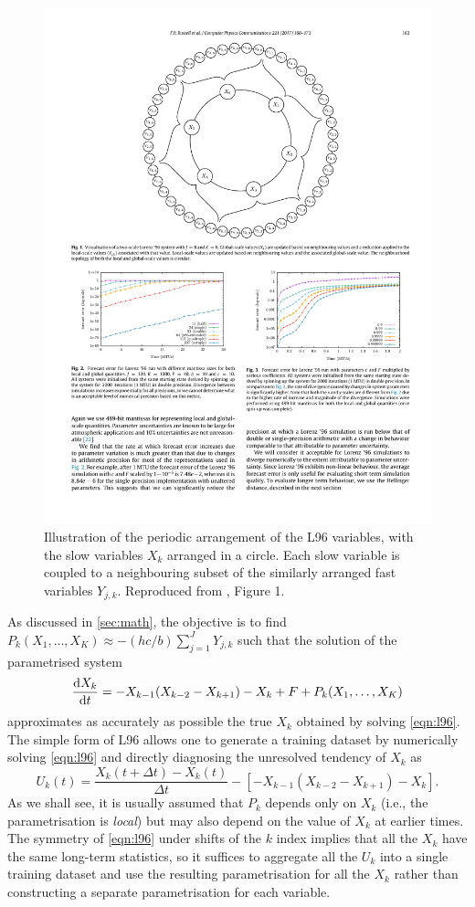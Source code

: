 \documentclass[../main.tex]{subfiles}
\begin{document}
\begin{figure}[ht]
    \centering
    \includegraphics[width=0.7\linewidth]{figures/russell2017_L96_diagram.pdf}
    \caption{ Illustration of the periodic arrangement of the L96 variables,
        with the slow variables $X_k$ arranged in a circle. Each slow variable
        is coupled to a neighbouring subset of the similarly arranged fast
        variables $Y_{j,k}$. Reproduced from \textcite{russell2017}, Figure 1.
        }
    \label{fig:L96_diagram}
\end{figure}

As discussed in \cref{sec:math}, the objective is to find $P_k(X_1,
\dots, X_K) \approx -(hc/b) \sum_{j=1}^J Y_{j,k}$ such that the solution of the
parametrised system
\begin{equation*}
    \frac{\mathrm{d} X_k}{\mathrm{d} t}
        = -X_{k-1} (X_{k-2} - X_{k+1}) - X_k + F + P_k(X_1, \dots, X_K)
\end{equation*}
approximates as accurately as possible the true $X_k$ obtained by solving
\cref{eqn:l96}. The simple form of L96 allows one to generate a training
dataset by numerically solving \cref{eqn:l96} and directly diagnosing the
unresolved tendency of $X_k$ as
\begin{equation} \label{eqn:l96_tendency}
    U_k(t) = \frac{X_k(t + \Delta t) - X_k(t)}{\Delta t}
        - \left[ -X_{k-1} (X_{k-2} - X_{k+1}) - X_k \right].
\end{equation}
As we shall see, it is usually assumed that $P_k$ depends only on $X_k$ (i.e.,
the parametrisation is \emph{local}) but may also depend on the value of $X_k$
at earlier times. The symmetry of \cref{eqn:l96} under shifts of the $k$ index
implies that all the $X_k$ have the same long-term statistics, so it suffices
to aggregate all the $U_k$ into a single training dataset and use the resulting
parametrisation for all the $X_k$ rather than constructing a separate
parametrisation for each variable.
\end{document}

